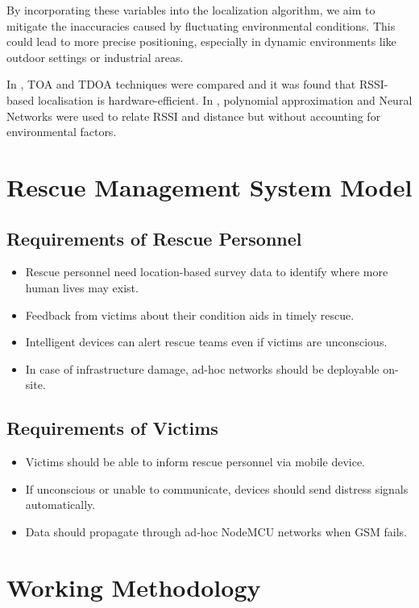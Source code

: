 \documentclass[conference]{IEEEtran}
\begin{document}
By incorporating these variables into the localization algorithm, we aim to mitigate the inaccuracies caused by fluctuating environmental conditions. This could lead to more precise positioning, especially in dynamic environments like outdoor settings or industrial areas.



In \cite{b5}, TOA and TDOA techniques were compared and it was found that RSSI-based localisation is hardware-efficient. In \cite{b6}, polynomial approximation and Neural Networks were used to relate RSSI and distance but without accounting for environmental factors.

\section{Rescue Management System Model}

\subsection{Requirements of Rescue Personnel}
\begin{itemize}
    \item Rescue personnel need location-based survey data to identify where more human lives may exist.
    \item Feedback from victims about their condition aids in timely rescue.
    \item Intelligent devices can alert rescue teams even if victims are unconscious.
    \item In case of infrastructure damage, ad-hoc networks should be deployable on-site.
\end{itemize}

\subsection{Requirements of Victims}
\begin{itemize}
    \item Victims should be able to inform rescue personnel via mobile device.
    \item If unconscious or unable to communicate, devices should send distress signals automatically.
    \item Data should propagate through ad-hoc NodeMCU networks when GSM fails.
\end{itemize}

\section{Working Methodology}
\end{document}
